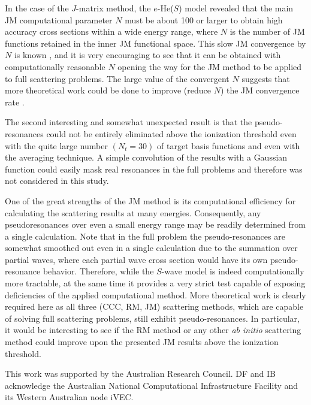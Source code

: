 \documentclass[aip
, pra
, showpacs
, aps
, twocolumn
, groupedaddress
, floatfix
]{revtex4}
\begin{document}
In the case of the $J$-matrix method, the $e$-He($S$) model revealed that the main JM computational parameter
$N$ must be about 100 or larger to obtain high accuracy cross sections within a wide energy range,
where $N$ is the number of JM functions retained in the inner JM functional space.
This slow JM convergence by $N$ is known \cite{HY74p1209},
and it is very encouraging to see that it can be obtained with computationally reasonable $N$
opening the way for the JM method to be applied to full scattering problems.
The large value of the convergent $N$ suggests that more theoretical work could be done to
improve (reduce $N$) the JM convergence rate \cite{VBA02p010404}.


The second interesting and somewhat unexpected result is that the pseudo-resonances could not be entirely eliminated
above the ionization threshold even with the quite large number $(N_t=30)$ of target basis functions
and even with the averaging technique.
A simple convolution of the results with a Gaussian function could easily mask real resonances in the full problems
and therefore was not considered in this study.


One of the great strengths of the JM method is its computational efficiency for calculating the scattering results at many energies. 
Consequently, any pseudoresonances over even a small energy range may be readily determined from a single calculation.
Note that in the full problem the pseudo-resonances are somewhat smoothed out
even in  a single calculation due to
the summation over partial waves, where each partial wave cross section would have its own pseudo-resonance behavior.
Therefore, while the $S$-wave model is indeed computationally more tractable, at the same time it provides a very strict test
capable of exposing deficiencies of the applied computational method.
More theoretical work is clearly required here as all three (CCC, RM, JM) scattering methods,
which are capable of solving full scattering problems, still exhibit pseudo-resonances.
In particular, it would be interesting to see if the RM method or any other {\em ab initio} scattering method could improve upon the
presented JM results above the ionization threshold.



\begin{acknowledgments}
This work was supported by the Australian Research Council. DF and IB
acknowledge the Australian National Computational Infrastructure
Facility and its Western Australian node iVEC.
\end{acknowledgments}





\end{document}
